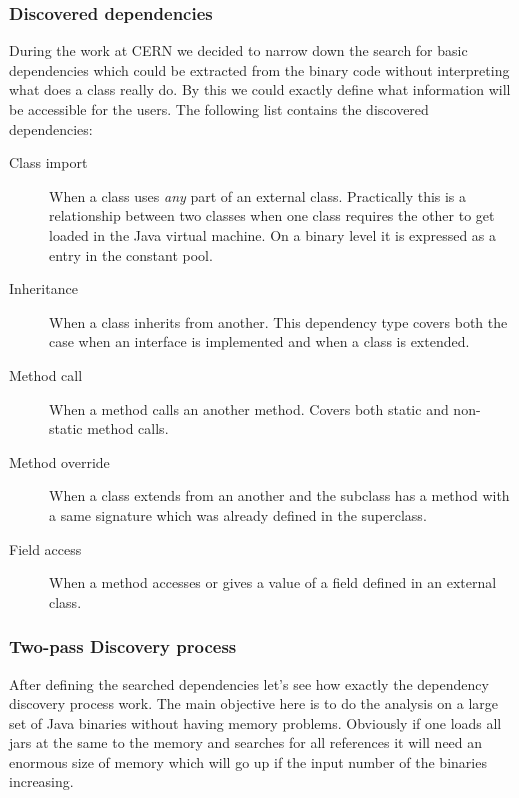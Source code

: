 \subsubsection{Discovered dependencies}
During the work at CERN we decided to narrow down the search for basic
dependencies which could be extracted from the binary code without interpreting
what does a class really do. By this we could exactly define what information
will be accessible for the users. The following list contains the discovered
dependencies:
\begin{description}
\item[Class import] When a class uses \emph{any} part of an external class. 
Practically this is a relationship between two classes when one class requires
the other to get loaded in the Java virtual machine. On a binary level it is 
expressed as a  entry in the constant pool.  
\item[Inheritance] When a class inherits from another. This dependency type 
covers both the case when an interface is implemented and when a class is 
extended. 
\item[Method call] When a method calls an another method. Covers both static 
and non-static method calls.
\item[Method override] When a class extends from an another and the subclass 
has a method with a same signature which was already defined in the superclass.  
\item[Field access] When a method accesses or gives a value of a field defined 
in an external class.
\end{description}


\subsubsection{Two-pass Discovery process}
After defining the searched dependencies let's see how exactly the dependency
discovery process work. The main objective here is to do the analysis on a large
set of Java binaries without having memory problems. Obviously if one loads all
jars at the same to the memory and searches for all references it will need an
enormous size of memory which will go up if the input number of the binaries
increasing.


